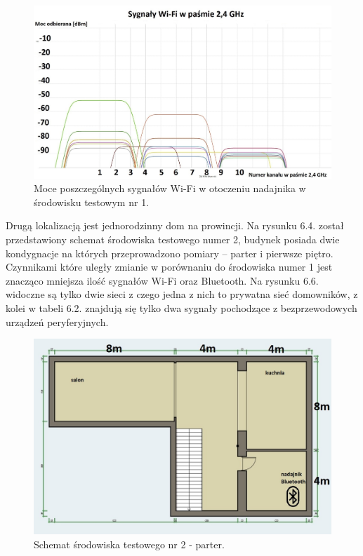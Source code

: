 \documentclass[12pt, twoside, openany]{mwrep}
\begin{document}
\begin{figure}[H]
\centering
\includegraphics[scale=0.35]{2,4Ghz}
\caption{Moce poszczególnych sygnałów Wi-Fi w otoczeniu nadajnika w środowisku testowym nr 1.}
\end{figure}
\par
Drugą lokalizacją jest jednorodzinny dom na prowincji. Na rysunku 6.4. został przedstawiony schemat środowiska testowego numer 2, budynek posiada dwie kondygnacje na których przeprowadzono pomiary – parter i pierwsze piętro. Czynnikami które uległy zmianie w porównaniu do środowiska numer 1 jest znacząco mniejsza ilość sygnałów Wi-Fi oraz Bluetooth. Na rysunku 6.6. widoczne są tylko dwie sieci z czego jedna z nich to prywatna sieć domowników, z kolei w tabeli 6.2. znajdują się tylko dwa sygnały pochodzące z bezprzewodowych urządzeń peryferyjnych.
\par
\begin{figure}[H]
\centering
\includegraphics[scale=0.4]{dom1pietro}
\caption{Schemat środowiska testowego nr 2 - parter.}
\end{figure}
\end{document}
